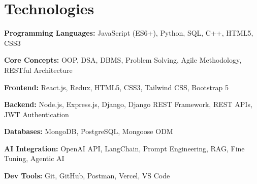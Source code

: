 \section{Technologies}

\begin{onecolentry}
    \textbf{Programming Languages:}
    JavaScript (ES6+), Python, SQL, C++, HTML5, CSS3
\end{onecolentry}

\begin{onecolentry}
    \textbf{Core Concepts:}
    OOP, DSA, DBMS, Problem Solving, Agile Methodology, RESTful Architecture
\end{onecolentry}

\begin{onecolentry}
    \textbf{Frontend:}
    React.js, Redux, HTML5, CSS3, Tailwind CSS, Bootstrap 5
\end{onecolentry}

\begin{onecolentry}
    \textbf{Backend:}
    Node.js, Express.js, Django, Django REST Framework, REST APIs, JWT Authentication
\end{onecolentry}

\begin{onecolentry}
    \textbf{Databases:}
    MongoDB, PostgreSQL, Mongoose ODM
\end{onecolentry}

\begin{onecolentry}
    \textbf{AI Integration:}
    OpenAI API, LangChain, Prompt Engineering, RAG, Fine Tuning, Agentic AI
\end{onecolentry}

\begin{onecolentry}
    \textbf{Dev Tools:}
    Git, GitHub, Postman, Vercel, VS Code
\end{onecolentry}